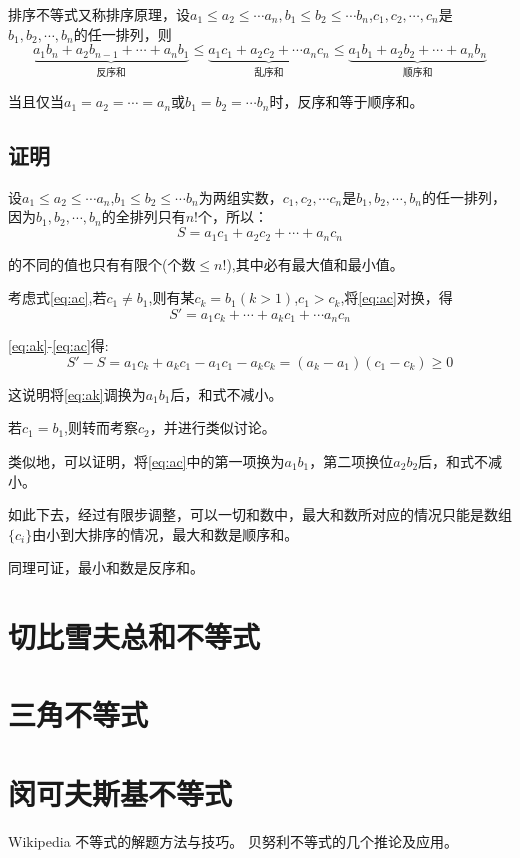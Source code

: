\documentclass[a4paper]{article} %
\numberwithin{equation}{section} %
\begin{document}
排序不等式又称排序原理，设$a_1\le a_2\le \cdots a_n,b_1\le b_2\le\cdots b_n$,$c_1,c_2,\cdots,c_n$是$b_1,b_2,\cdots,b_n$的任一排列，则
\begin{equation}
 \underbrace{a_1b_n+a_2b_{n-1}+\cdots+a_nb_1}_{\text{反序和}}\le \underbrace{a_1c_1+a_2c_2+\cdots a_nc_n}_{\text{乱序和}}\le\underbrace{a_1b_1+a_2b_2+\cdots+a_nb_n}_{\text{顺序和}} 
\end{equation}

当且仅当$a_1=a_2=\cdots=a_n$或$b_1=b_2=\cdots b_n$时，反序和等于顺序和。

\subsection{证明}
设$a_1\le a_2\le \cdots a_n$,$b_1\le b_2\le \cdots b_n$为两组实数，$c_1,c_2,\cdots c_n$是$b_1,b_2,\cdots,b_n$的任一排列，因为$b_1,b_2,\cdots,b_n$的全排列只有$n!$个，所以：
\begin{equation}
S=a_1c_1+a_2c_2+\cdots+a_nc_n \label{eq:ac}
\end{equation}

的不同的值也只有有限个(个数$\le n!$),其中必有最大值和最小值。

考虑式\eqref{eq:ac},若$c_1\neq b_1$,则有某$c_k=b_1(k>1)$,$c_1>c_k$,将\eqref{eq:ac}对换，得
\begin{equation}
S'=a_1c_k+\cdots +a_kc_1+\cdots a_nc_n \label{eq:ak}
\end{equation}

\eqref{eq:ak}-\eqref{eq:ac}得:
\begin{equation}
S'-S=a_1c_k+a_kc_1-a_1c_1-a_kc_k=(a_k-a_1)(c_1-c_k)\ge 0
\end{equation}

这说明将\eqref{eq:ak}调换为$a_1b_1$后，和式不减小。

若$c_1=b_1$,则转而考察$c_2$，并进行类似讨论。

类似地，可以证明，将\eqref{eq:ac}中的第一项换为$a_1b_1$，第二项换位$a_2b_2$后，和式不减小。

如此下去，经过有限步调整，可以一切和数中，最大和数所对应的情况只能是数组$\{c_i\}$由小到大排序的情况，最大和数是顺序和。

同理可证，最小和数是反序和。


\section{切比雪夫总和不等式}

\section{三角不等式}

\section{闵可夫斯基不等式}


\begin{thebibliography}{99}
Wikipedia
不等式的解题方法与技巧。
贝努利不等式的几个推论及应用。
\end{thebibliography}
\end{document}
